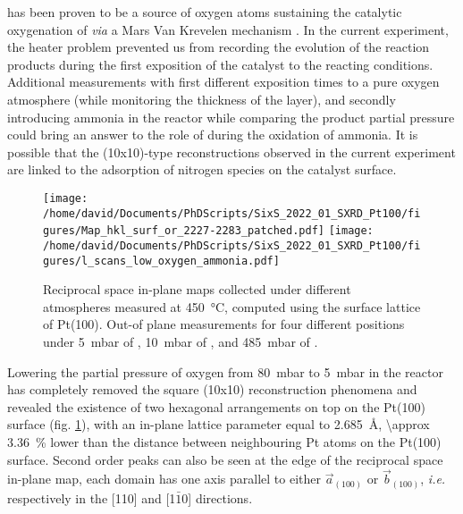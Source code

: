  has been proven to be a source of oxygen atoms sustaining the catalytic oxygenation of  \textit{via} a Mars Van Krevelen mechanism \parencite{Seriani2006, Seriani2008}.
In the current experiment, the heater problem prevented us from recording the evolution of the reaction products during the first exposition of the catalyst to the reacting conditions.
Additional measurements with first different exposition times to a pure oxygen atmosphere (while monitoring the thickness of the  layer), and secondly introducing ammonia in the reactor while comparing the product partial pressure could bring an answer to the role of  during the oxidation of ammonia.
It is possible that the (10x10)-type reconstructions observed in the current experiment are linked to the adsorption of nitrogen species on the catalyst surface.

\begin{figure}[!htb]
    \centering
    \texttt{[image: /home/david/Documents/PhDScripts/SixS\_2022\_01\_SXRD\_Pt100/figures/Map\_hkl\_surf\_or\_2227-2283\_patched.pdf]}
    \texttt{[image: /home/david/Documents/PhDScripts/SixS\_2022\_01\_SXRD\_Pt100/figures/l\_scans\_low\_oxygen\_ammonia.pdf]}
    \caption{
        Reciprocal space in-plane maps collected under different atmospheres measured at \qty{450}{\degreeCelsius}, computed using the surface lattice of Pt(100).
        Out-of plane measurements for four different positions under \qty{5}{\milli\bar} of , \qty{10}{\milli\bar} of , and \qty{485}{\milli\bar} of .
    }
    \label{fig:MapsAndLScansPt100LowOxAmmonia}
\end{figure}

Lowering the partial pressure of oxygen from \qty{80}{\milli\bar} to \qty{5}{\milli\bar} in the reactor has completely removed the square (10x10) reconstruction phenomena and revealed the existence of two hexagonal arrangements on top on the Pt(100) surface (fig. \ref{fig:MapsAndLScansPt100LowOxAmmonia}), with an in-plane lattice parameter equal to \qty{2.685}{\angstrom}, \qty{\approx 3.36}{\percent} lower than the distance between neighbouring Pt atoms on the Pt(100) surface.
Second order peaks can also be seen at the edge of the reciprocal space in-plane map, each domain has one axis parallel to either $\vec{a}_{(100)}$ or $\vec{b}_{(100)}$, \textit{i.e.} respectively in the [110] and [1$\bar{1}$0] directions.


